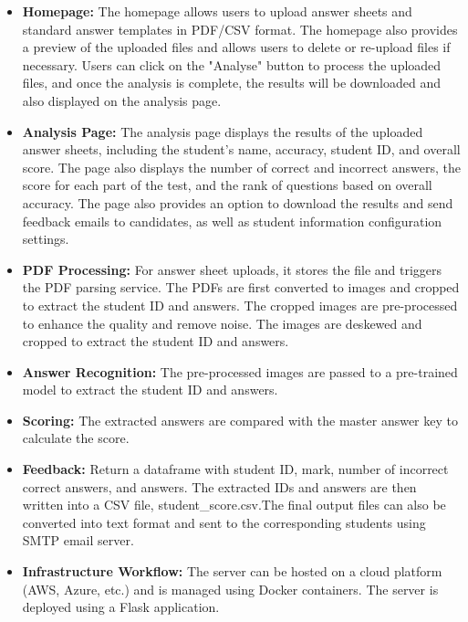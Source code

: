 \documentclass[twocolumn]{article}
\begin{document}
        \begin{itemize}
            \item \textbf{Homepage:} The homepage allows users to upload answer sheets and standard answer templates in PDF/CSV format. The homepage also provides a preview of the uploaded files and allows users to delete or re-upload files if necessary. Users can click on the "Analyse" button to process the uploaded files, and once the analysis is complete, the results will be downloaded and also displayed on the analysis page.
            \item \textbf{Analysis Page:} The analysis page displays the results of the uploaded answer sheets, including the student's name, accuracy, student ID, and overall score. The page also displays the number of correct and incorrect answers, the score for each part of the test, and the rank of questions based on overall accuracy. The page also provides an option to download the results and send feedback emails to candidates, as well as student information configuration settings.
            \item \textbf{PDF Processing:} For answer sheet uploads, it stores the file and triggers the PDF parsing service. The PDFs are first converted to images and cropped to extract the student ID and answers. The cropped images are pre-processed to enhance the quality and remove noise. The images are deskewed and cropped to extract the student ID and answers.
            \item \textbf{Answer Recognition:} The pre-processed images are passed to a pre-trained model to extract the student ID and answers.
            \item \textbf{Scoring:} The extracted answers are compared with the master answer key to calculate the score.
            \item \textbf{Feedback:} Return a dataframe with student ID, mark, number of incorrect correct answers, and answers. The extracted IDs and answers are then written into a CSV file, student\_score.csv.The final output files can also be converted into text format and sent to the corresponding students using SMTP email server.
            \item \textbf{Infrastructure Workflow:} The server can be hosted on a cloud platform (AWS, Azure, etc.) and is managed using Docker containers. The server is deployed using a Flask application.
        \end{itemize}
\end{document}
